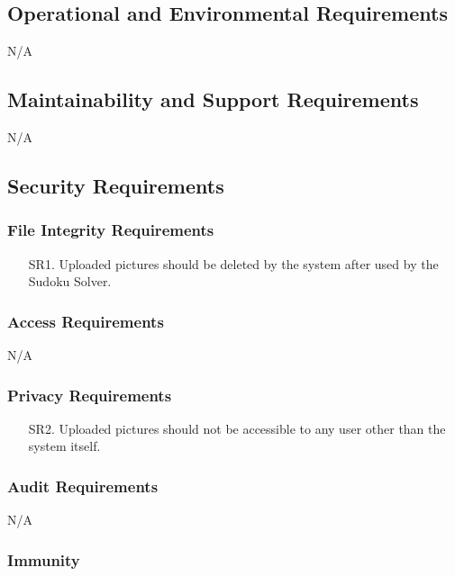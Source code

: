 \documentclass[11pt]{article}
\begin{document}
\subsection{Operational and Environmental Requirements}

N/A

\subsection{Maintainability and Support Requirements} %

N/A

\subsection{Security Requirements}

\subsubsection{File Integrity Requirements}

\begin{enumerate}
    \item [SR1.] Uploaded pictures should be deleted by the system after used by the Sudoku Solver.
\end{enumerate}

\subsubsection{Access Requirements}

N/A

\subsubsection{Privacy Requirements}

\begin{enumerate}
    \item [SR2.] Uploaded pictures should not be accessible to any user other than the system itself.
\end{enumerate}

\subsubsection{Audit Requirements}

N/A

\subsubsection{Immunity}
\end{document}
